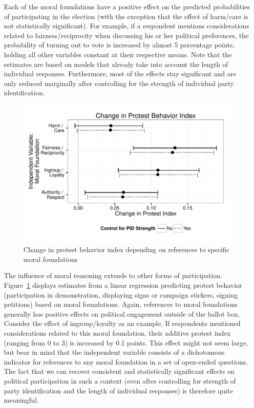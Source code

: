 \documentclass[12pt]{article}
\begin{document}
Each of the moral foundations have a positive effect on the predicted probabilities of participating in the election (with the exception that the effect of harm/care is not statistically significant). For example, if a respondent mentions considerations related to fairness/reciprocity when discussing his or her political preferences, the probability of turning out to vote is increased by almost 5 percentage points, holding all other variables constant at their respective means. Note that the estimates are based on models that already take into account the length of individual responses. Furthermore, most of the effects stay significant and are only reduced marginally after controlling for the strength of individual party identification.

\begin{figure}[h]\centering
\includegraphics[scale=.9]{../calc/fig/fig6part.pdf}
\caption{Change in protest behavior index depending on references to specific moral foundations}\label{fig:6part}
\end{figure}

The influence of moral reasoning extends to other forms of participation. Figure~\ref{fig:6part} displays estimates from a linear regression predicting protest behavior (participation in demonstration, displaying signs or campaign stickers, signing petitions) based on moral foundations. Again, references to moral foundations generally has positive effects on political engagement outside of the ballot box. Consider the effect of ingroup/loyalty as an example. If respondents mentioned considerations related to this moral foundation, their additive protest index (ranging from 0 to 3) is increased by 0.1 points. This effect might not seem large, but bear in mind that the independent variable consists of a dichotomous indicator for references to any moral foundation in a set of open-ended questions. The fact that we can recover consistent and statistically significant effects on political participation in such a context (even after controlling for strength of party identification and the length of individual responses) is therefore quite meaningful.
\end{document}
